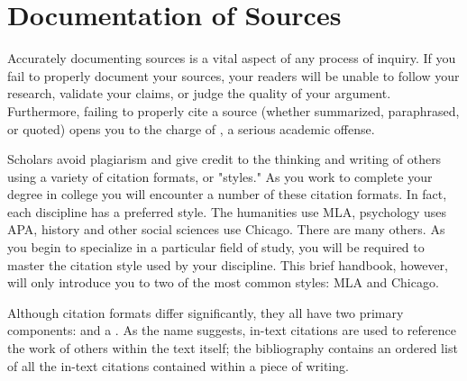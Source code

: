 
\hypertarget{citation}{}

\chapter{Documentation of Sources}

Accurately documenting sources is a vital aspect of any process of inquiry. If
you fail to  properly document your sources, your readers will be unable to
follow your research,  validate your claims, or judge the quality of your
argument. Furthermore, failing to  properly cite a source (whether summarized,
paraphrased, or quoted) opens you to the  charge of
\hyperlink{plagiarism}{\color{Ahrenge}{plagiarism}}, a serious academic offense.

Scholars avoid plagiarism and give credit to the thinking and writing of others
using a  variety of citation formats, or "styles." As you work to complete your
degree in college  you will encounter a number of these citation formats. In
fact, each discipline has a  preferred style. The humanities use MLA, psychology
uses APA, history and other social  sciences use Chicago. There are many others.
As you begin to specialize in a particular field of study, you will be required
to master the citation style used by your discipline.  This brief handbook,
however, will only introduce you to two of the most common styles: MLA and
Chicago.

Although citation formats differ significantly, they all have two primary
components:   and a . As
the name suggests, in-text  citations are used to reference the work of others
within the text itself; the  bibliography contains an ordered list of all the
in-text citations contained within a  piece of writing.

